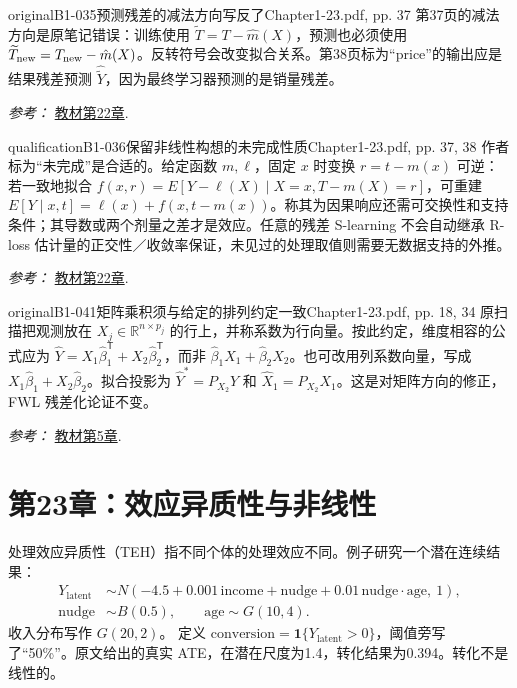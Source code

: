 {\begin{reviewnote}{original}{B1-035}{预测残差的减法方向写反了}{Chapter1-23.pdf, pp. 37}
第37页的减法方向是原笔记错误：训练使用 $\widetilde T=T-\hat m(X)$，预测也必须使用 $\widetilde T_{\rm new}=T_{\rm new}-\hat m(X)$。反转符号会改变拟合关系。第38页标为“price”的输出应是结果残差预测 $\widehat{\widetilde Y}$，因为最终学习器预测的是销量残差。
\par\smallskip\textit{参考：} \href{https://matheusfacure.github.io/python-causality-handbook/22-Debiased-Orthogonal-Machine-Learning.html}{教材第22章}.
\end{reviewnote}

\begin{reviewnote}{qualification}{B1-036}{保留非线性构想的未完成性质}{Chapter1-23.pdf, pp. 37, 38}
作者标为“未完成”是合适的。给定函数 $m,\ell$，固定 $x$ 时变换 $r=t-m(x)$ 可逆：若一致地拟合 $f(x,r)=E[Y-\ell(X)\mid X=x,T-m(X)=r]$，可重建 $E[Y\mid x,t]=\ell(x)+f(x,t-m(x))$。称其为因果响应还需可交换性和支持条件；其导数或两个剂量之差才是效应。任意的残差 S-learning 不会自动继承 R-loss 估计量的正交性／收敛率保证，未见过的处理取值则需要无数据支持的外推。
\par\smallskip\textit{参考：} \href{https://matheusfacure.github.io/python-causality-handbook/22-Debiased-Orthogonal-Machine-Learning.html}{教材第22章}.
\end{reviewnote}
\begin{reviewnote}{original}{B1-041}{矩阵乘积须与给定的排列约定一致}{Chapter1-23.pdf, pp. 18, 34}
原扫描把观测放在 $X_j\in\mathbb R^{n\times p_j}$ 的行上，并称系数为行向量。按此约定，维度相容的公式应为 $\hat Y=X_1\hat\beta_1^{\mathsf T}+X_2\hat\beta_2^{\mathsf T}$，而非 $\hat\beta_1X_1+\hat\beta_2X_2$。也可改用列系数向量，写成 $X_1\hat\beta_1+X_2\hat\beta_2$。拟合投影为 $\hat Y^*=P_{X_2}Y$ 和 $\hat X_1=P_{X_2}X_1$。这是对矩阵方向的修正，FWL 残差化论证不变。
\par\smallskip\textit{参考：} \href{https://matheusfacure.github.io/python-causality-handbook/05-The-Unreasonable-Effectiveness-of-Linear-Regression.html}{教材第5章}.
\end{reviewnote}

\section{第23章：效应异质性与非线性}
处理效应异质性（TEH）指不同个体的处理效应不同。例子研究一个潜在连续结果：
\begin{align*}
Y_{\mathrm{latent}}&\sim N(-4.5+0.001\,\mathrm{income}+\mathrm{nudge}
+0.01\,\mathrm{nudge}\cdot\mathrm{age},\ 1),\\
\mathrm{nudge}&\sim B(0.5),\qquad \mathrm{age}\sim G(10,4).
\end{align*}
收入分布写作 $G(20,2)$。 定义 $\mathrm{conversion}=\mathbf1\{Y_{\mathrm{latent}}>0\}$，阈值旁写了“50\%”。原文给出的真实 ATE，在潜在尺度为1.4，转化结果为0.394。转化不是线性的。

}
